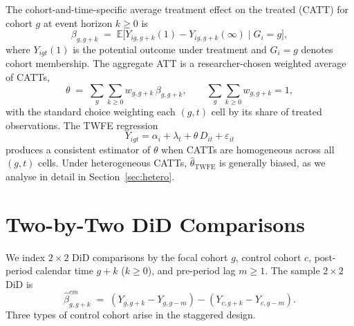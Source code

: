 \documentclass[12pt,letterpaper]{article}
\theoremstyle{remark}
\theoremstyle{definition}
\newcommand{\E}{\mathbb{E}}
\newcommand{\TWFE}{\hat{\theta}_{\mathrm{TWFE}}}
\newcommand{\hbeta}{\hat{\beta}}
\begin{document}
The cohort-and-time-specific average treatment effect on the treated (CATT)
for cohort $g$ at event horizon $k\geq0$ is
\begin{equation}
  \beta_{g,g+k}
  \;=\;
  \E\!\bigl[Y_{ig,g+k}(1)-Y_{ig,g+k}(\infty)\mid G_i=g\bigr],
  \label{eq:catt}
\end{equation}
where $Y_{igt}(1)$ is the potential outcome under treatment and $G_i=g$ denotes
cohort membership. The aggregate ATT is a researcher-chosen weighted average of
CATTs,
\begin{equation}
  \theta \;=\; \sum_{g}\sum_{k\geq0}w_{g,g+k}\,\beta_{g,g+k},
  \qquad \sum_{g}\sum_{k\geq0}w_{g,g+k}=1,
  \label{eq:att}
\end{equation}
with the standard choice weighting each $(g,t)$ cell by its share of treated
observations. The TWFE regression
\begin{equation}
  Y_{igt} = \alpha_i + \lambda_t + \theta\,D_{it} + \varepsilon_{it}
  \label{eq:twfe}
\end{equation}
produces a consistent estimator of $\theta$ when CATTs are homogeneous across
all $(g,t)$ cells. Under heterogeneous CATTs, $\TWFE$ is generally biased, as
we analyse in detail in Section~\ref{sec:hetero}.

\section{Two-by-Two DiD Comparisons}
\label{sec:2x2}

We index $2\times2$ DiD comparisons by the focal cohort $g$, control cohort
$c$, post-period calendar time $g+k$ ($k\geq0$), and pre-period lag $m\geq1$.
The sample $2\times2$ DiD is
\begin{equation}
  \hbeta^{cm}_{g,g+k}
  \;=\;
  (Y_{g,g+k}-Y_{g,g-m})-(Y_{c,g+k}-Y_{c,g-m}).
  \label{eq:2x2}
\end{equation}
Three types of control cohort arise in the staggered design.
\end{document}
